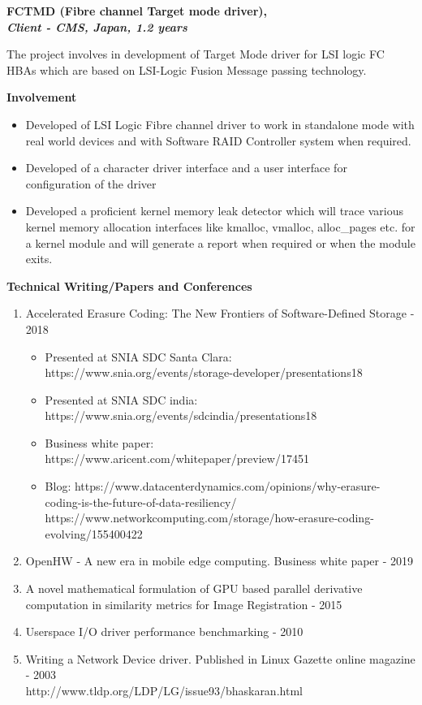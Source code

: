 \documentclass[a4paper,10pt]{memoir} %
\newcommand{\SmallSep}{\vspace{0.5em}} %
\newcommand{\CVSection}[1]{ %
{\Large\textbf{#1}}\par
\SmallSep %
}
\newcommand{\CVItem}[2]{ %
\textbf{\color{RoyalBlue} #1}\par
#2
\SmallSep %
}
\begin{document}
\CVItem{FCTMD (Fibre channel Target mode driver), \\
\textit{Client - CMS, Japan, 1.2 years}} {
The project involves in development of Target Mode driver for LSI logic FC HBAs which are based on LSI-Logic Fusion Message passing technology. 

\textbf{Involvement}
\begin{itemize}
\item Developed of LSI Logic Fibre channel driver to work in standalone mode with real world devices and with Software RAID Controller system when required.
\item Developed of a character driver interface and a user interface for configuration of the driver
\item Developed a proficient kernel memory leak detector which will trace various kernel memory allocation interfaces like kmalloc, vmalloc, alloc\_pages etc. for a kernel module and will generate a report when required or when the module exits. 

\end{itemize}
\hrulefill
}

\CVSection{Technical Writing/Papers and Conferences}
\begin{enumerate}
	
	\item Accelerated Erasure Coding: The New Frontiers of Software-Defined Storage - 2018   
	\begin{itemize}
		\item    Presented at SNIA SDC Santa Clara: https://www.snia.org/events/storage-developer/presentations18 
		\item    Presented at SNIA SDC india: https://www.snia.org/events/sdcindia/presentations18 
		\item Business white paper: https://www.aricent.com/whitepaper/preview/17451          
		\item   Blog: https://www.datacenterdynamics.com/opinions/why-erasure-coding-is-the-future-of-data-resiliency/  \\
		https://www.networkcomputing.com/storage/how-erasure-coding-evolving/155400422  
	\end{itemize}
	\item OpenHW - A new era in mobile edge computing. Business white paper - 2019
	\item A novel mathematical formulation of GPU based parallel derivative computation in similarity metrics for Image Registration - 2015
	\item Userspace I/O driver performance benchmarking - 2010
	\item Writing a Network Device driver. Published in Linux Gazette online magazine - 2003 \\
	http://www.tldp.org/LDP/LG/issue93/bhaskaran.html
\end{enumerate}
\end{document}
